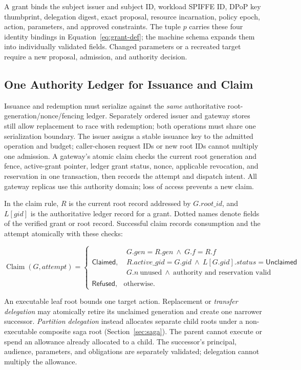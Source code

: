 A grant binds the subject issuer and subject ID, workload SPIFFE ID, DPoP key thumbprint, delegation digest, exact proposal, resource incarnation, policy epoch, action, parameters, and approved constraints. The tuple $p$ carries these four identity bindings in Equation~\ref{eq:grant-def}; the machine schema expands them into individually validated fields. Changed parameters or a recreated target require a new proposal, admission, and authority decision.

\subsection{One Authority Ledger for Issuance and Claim}
\label{sec:authority-ledger}
Issuance and redemption must serialize against the \emph{same} authoritative root-generation/nonce/fencing ledger. Separately ordered issuer and gateway stores still allow replacement to race with redemption; both operations must share one serialization boundary. The issuer assigns a stable issuance key to the admitted operation and budget; caller-chosen request IDs or new root IDs cannot multiply one admission. A gateway's atomic claim checks the current root generation and fence, active-grant pointer, ledger grant status, nonce, applicable revocation, and reservation in one transaction, then records the attempt and dispatch intent. All gateway replicas use this authority domain; loss of access prevents a new claim.

In the claim rule, $R$ is the current root record addressed by $G.root\_id$, and $L[gid]$ is the authoritative ledger record for a grant. Dotted names denote fields of the verified grant or root record. Successful claim records consumption and the attempt atomically with these checks:

\begin{equation}
\operatorname{Claim}(G, attempt) =
\begin{cases}
\textsf{Claimed}, & \substack{G.gen = R.gen\ \land\ G.f = R.f\\
R.active\_gid=G.gid\ \land\ L[G.gid].status = \textsf{Unclaimed}\\
G.n\ \text{unused}\ \land\
\text{authority and reservation valid}}\\
\textsf{Refused}, & \text{otherwise.}
\end{cases}
\end{equation}

An executable leaf root bounds one target action. Replacement or \emph{transfer delegation} may atomically retire its unclaimed generation and create one narrower successor. \emph{Partition delegation} instead allocates separate child roots under a non-executable composite saga root (Section~\ref{sec:saga}). The parent cannot execute or spend an allowance already allocated to a child. The successor's principal, audience, parameters, and obligations are separately validated; delegation cannot multiply the allowance.

